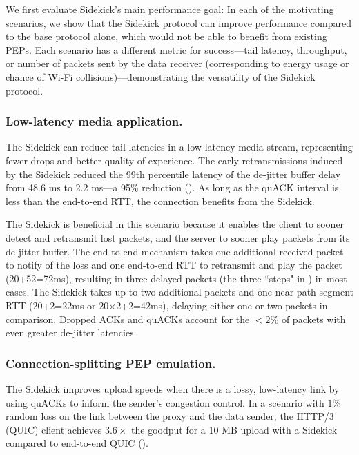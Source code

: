 We first evaluate Sidekick's main performance goal: In each of the motivating
scenarios, we show that the Sidekick protocol can improve performance compared
to the base protocol alone, which would not be able to benefit from existing
PEPs. Each scenario has a different metric for success---tail latency,
throughput, or number of packets sent by the data receiver (corresponding to
energy usage or chance of Wi-Fi collisions)---demonstrating the versatility of
the Sidekick protocol.

\subsubsection{Low-latency media application.}
The Sidekick can reduce tail latencies in a low-latency media stream, representing
fewer drops and better quality of experience.
The early retransmissions induced by the Sidekick reduced the 99th percentile
latency of the de-jitter buffer delay from 48.6 ms to 2.2 ms---a 95\%
reduction ().
As long as the quACK interval is less than the end-to-end RTT, the connection
benefits from the Sidekick.

The Sidekick is beneficial in this scenario because it enables the client to sooner
detect and retransmit lost packets, and the server to sooner play packets from
its de-jitter buffer.
The end-to-end mechanism takes one additional received packet to notify of the
loss and
one end-to-end RTT to retransmit and play the packet (20+52=72ms), resulting in
three delayed packets (the three ``steps" in ) in most cases.
The Sidekick takes up to two additional packets and one near path segment RTT
(20+2=22ms or 20$\times$2+2=42ms), delaying either one or two packets in comparison.
Dropped ACKs and quACKs account for the $<2\%$ of packets with even greater
de-jitter latencies.

\subsubsection{Connection-splitting PEP emulation.}
The Sidekick improves upload speeds when there is a lossy, low-latency link
by using quACKs to inform the sender's congestion control.
In a scenario with $1\%$ random loss on the link between the proxy and the
data sender, the HTTP/3 (QUIC) client achieves $3.6\times$ the goodput for a 10 MB
upload with a Sidekick compared to end-to-end QUIC ().

